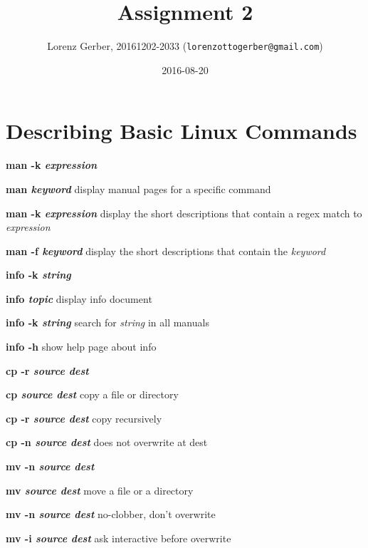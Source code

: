 \documentclass[a4paper,11pt,twoside]{article}
\title{Assignment 2}
\author{Lorenz Gerber, 20161202-2033 ({\tt{lorenzottogerber@gmail.com}})}
\date{2016-08-20}
\begin{document}
\lstset{language=C}
\maketitle
\thispagestyle{empty}
\newpage

\clearpage
{}

\section{Describing Basic Linux Commands} 

\begin{labeling}{\textbf{man -k \textit{expression}}}
\item [\textbf{man \textit{keyword}}] display manual pages for a specific command 
\item [\textbf{man -k \textit{expression}}] display the short descriptions that contain a regex match to \textit{expression}
\item [\textbf{man -f \textit{keyword}}] display the short descriptions that contain the \textit{keyword} 
\end{labeling}

\vspace{5mm}

\begin{labeling}{\textbf{info -k \textit{string}}}
\item [\textbf{info \textit{topic}}] display info document
\item [\textbf{info -k \textit{string}}] search for \textit{string} in all manuals
\item [\textbf{info -h}] show help page about info
\end{labeling}

\vspace{1mm}

\begin{labeling}{\textbf{cp -r \textit{source dest}}}
\item [\textbf{cp \textit{source dest}}] copy a file or directory
\item [\textbf{cp -r \textit{source dest}}] copy recursively
\item [\textbf{cp -n \textit{source dest}}] does not overwrite at dest
\end{labeling}

\vspace{1mm}

\begin{labeling}{\textbf{mv -n \textit{source dest}}}
\item [\textbf{mv \textit{source dest}}] move a file or a directory
\item [\textbf{mv -n \textit{source dest}}] no-clobber, don't overwrite 
\item [\textbf{mv -i \textit{source dest}}] ask interactive before overwrite
\end{labeling}
\end{document}
